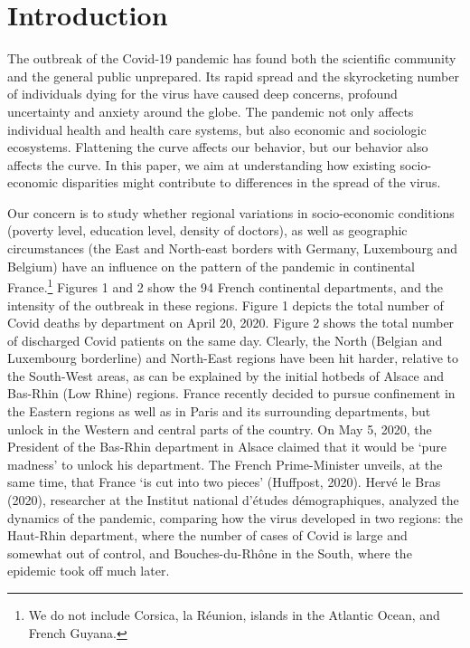 \documentclass[a4paper]{article}
\theoremstyle{plain}
\theoremstyle{definition}
\begin{document}
\newpage

\section{Introduction}

The outbreak of the Covid-19 pandemic has found both the scientific community and the general public unprepared. Its rapid spread and the skyrocketing number of individuals dying for the virus have caused deep concerns, profound uncertainty and anxiety around the globe. The pandemic not only affects individual health and health care systems, but also economic and sociologic ecosystems. Flattening the curve affects our behavior, but our behavior also affects the curve. In this paper, we aim at understanding how existing socio-economic disparities might contribute to differences in the spread of the virus.

Our concern is to study whether regional variations in socio-economic conditions (poverty level, education level, density of doctors), as well as geographic circumstances (the East and North-east borders with Germany, Luxembourg and Belgium) have an influence on the pattern of the pandemic in continental France.\footnote{We do not include Corsica, la R\'eunion, islands in the Atlantic Ocean, and French Guyana.} Figures 1 and 2 show the 94 French continental departments, and the intensity of the outbreak in these regions. Figure 1 depicts the total number of Covid deaths by department on April 20, 2020. Figure 2 shows the total number of discharged Covid patients on the same day. Clearly, the North (Belgian and Luxembourg borderline) and North-East regions have been hit harder, relative to the South-West areas, as can be explained by the initial hotbeds of Alsace and Bas-Rhin (Low Rhine) regions. France recently decided to pursue confinement in the Eastern regions as well as in Paris and its surrounding  departments, but unlock in the Western and central parts of the country. On May 5, 2020, the President of the Bas-Rhin department in  Alsace claimed that it would be `pure madness' to unlock his department. The French Prime-Minister unveils, at the same time, that France `is cut into two pieces' (Huffpost, 2020). Herv\'e le Bras (2020), researcher at the Institut national d'\'etudes  d\'emographiques, analyzed the dynamics of the pandemic, comparing how the virus developed in two regions: the Haut-Rhin department, where the  number of cases of Covid is large and somewhat out of control, and Bouches-du-Rh\^one in the South,  where the epidemic took off much later. 
\end{document}
